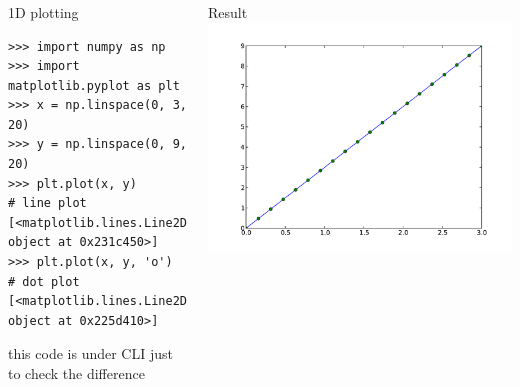 \documentclass[colorlinks]{beamer}
\begin{document}
\begin{frame}[fragile]\frametitle{}
\begin{columns}[c]
\begin{block}{1D plotting }
\tiny
\begin{verbatim}
>>> import numpy as np
>>> import matplotlib.pyplot as plt
>>> x = np.linspace(0, 3, 20)
>>> y = np.linspace(0, 9, 20)
>>> plt.plot(x, y)       # line plot    
[<matplotlib.lines.Line2D object at 0x231c450>]
>>> plt.plot(x, y, 'o')  # dot plot    
[<matplotlib.lines.Line2D object at 0x225d410>]
\end{verbatim}

this code is under CLI just to check the difference
\end{block}

\begin{block}{Result}
\includegraphics[width=\textwidth]{plwfigis/CursP_2_figure2}

\end{block}
\end{columns}
\end{frame}
\end{document}
